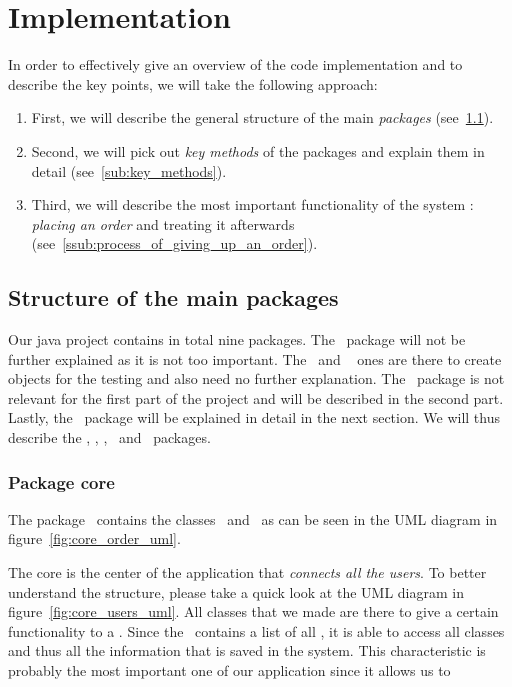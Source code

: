 \section{Implementation} %
\label{sec:implementation}

In order to effectively give an overview of the code implementation
and to describe the key points, we will take the following approach: 

\begin{enumerate}
	\item First, we will describe the general structure of the
  main \emph{packages} (see~\ref{sub:structure_of_the_main_packages}).
	\item Second, we will pick out \emph{key methods} of the packages
  and explain them in detail (see~\ref{sub:key_methods}). 
	\item Third, we will describe the most important functionality of the system :
  \emph{placing an order} and treating it afterwards (see~\ref{ssub:process_of_giving_up_an_order}).
\end{enumerate}

\subsection{Structure of the main packages} %
\label{sub:structure_of_the_main_packages}
Our java project contains in total nine packages.
The \exceptions~package will not be further explained as it is not too important.
The \parsers~and \txtF~ ones are there to create objects for the testing
and also need no further explanation.
The \userI~package is not relevant for the first part of the project
and will be described in the second part.
Lastly, the \tests~package will be explained in detail in the next section.
We will thus describe the \policies, \restaurantSetup, \policies, \tests~and
\users~packages. 

\subsubsection{Package core} %
\label{ssub:core}
The package \core~contains the classes \Core~and \Order~as can be seen in
the UML diagram in figure~\ref{fig:core_order_uml}. 

The core is the center of the application that \emph{connects all the users}.
To better understand the structure, please take a quick look at the UML diagram
in figure~\ref{fig:core_users_uml}. 
All classes that we made are there to give a certain functionality to a \User.
Since the \Core~contains a list of all \User, it is able to access all classes
and thus all the information that is saved in the system.
This characteristic is probably the most important one of our application since it allows us to

